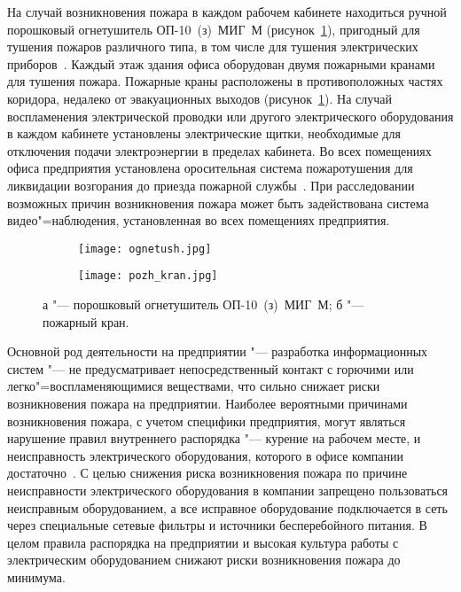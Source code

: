 На случай возникновения пожара в каждом рабочем кабинете находиться ручной порошковый огнетушитель \mbox{ОП-10}~(з)~МИГ~М (рисунок~\ref{fig:extinguishing_fire}), пригодный для тушения пожаров различного типа, в том числе для тушения электрических приборов~\cite[\ignore{раздел 5.5.7,} с.~221\,--\,323]{michnuk_2009}.
Каждый этаж здания офиса оборудован двумя пожарными кранами для тушения пожара.
Пожарные краны расположены в противоположных частях коридора, недалеко от эвакуационных выходов (рисунок~\ref{fig:extinguishing_fire}).
На случай воспламенения электрической проводки или другого электрического оборудования в каждом кабинете установлены электрические щитки, необходимые для отключения подачи электроэнергии в пределах кабинета.
Во всех помещениях офиса предприятия установлена оросительная система пожаротушения для ликвидации возгорания до приезда пожарной службы~\cite[\ignore{раздел~5.5.6,} с.~318\,--\,320]{michnuk_2009}.
При расследовании возможных причин возникновения пожара может быть задействована система видео"=наблюдения, установленная во всех помещениях предприятия.

\begin{figure}[ht]
\centering
  \begin{subfigure}[b]{0.45\textwidth}
    \centering
    \texttt{[image: ognetush.jpg]}
    \caption{}
  \end{subfigure}
  \begin{subfigure}[b]{0.45\textwidth}
    \centering
    \texttt{[image: pozh\_kran.jpg]}
    \caption{}
  \end{subfigure}
  \caption{ а "--- порошковый огнетушитель \mbox{ОП-10}~(з)~МИГ~М;
            б "--- пожарный кран.}
  \label{fig:extinguishing_fire}
\end{figure}

Основной род деятельности на предприятии "--- разработка информационных систем "--- не предусматривает непосредственный контакт с горючими или легко"=воспламеняющимися веществами, что сильно снижает риски возникновения пожара на предприятии.
Наиболее вероятными причинами возникновения пожара, с учетом специфики предприятия, могут являться нарушение правил внутреннего распорядка "--- курение на рабочем месте, и неисправность электрического оборудования, которого в офисе компании достаточно~\cite[\ignore{раздел 5.5.1,} с.~312]{michnuk_2009}.
С целью снижения риска возникновения пожара по причине неисправности электрического оборудования в компании запрещено пользоваться неисправным оборудованием, а все исправное оборудование подключается в сеть через специальные сетевые фильтры и источники бесперебойного питания.
В целом правила распорядка на предприятии и высокая культура работы с электрическим оборудованием снижают риски возникновения пожара до минимума.


